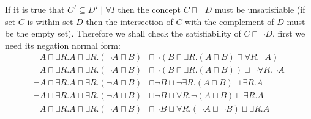 \documentclass[a4paper,12pt]{article}
\begin{document}
If it is true that $ C^I \subseteq D^I \mid \forall I$ then the concept $ C
\sqcap \neg D $ must be unsatisfiable (if set $C$ is within set $D$ then the
intersection of $C$ with the complement of $D$ must be the empty set).
Therefore we shall check the satisfiability of $ C \sqcap \neg D $, first we
need its negation normal form:
\begin{align*}
        \neg A \sqcap \exists R.A \sqcap \exists R.(\neg A \sqcap B)
&\sqcap \neg (B \sqcap \exists R.(A \sqcap B) \sqcap \forall R.\neg A)\\
        \neg A \sqcap \exists R.A \sqcap \exists R.(\neg A \sqcap B)
&\sqcap \neg (B \sqcap \exists R.(A \sqcap B)) \sqcup \neg \forall R.\neg A\\
        \neg A \sqcap \exists R.A \sqcap \exists R.(\neg A \sqcap B)
&\sqcap \neg B \sqcup \neg \exists R.(A \sqcap B) \sqcup \exists R.A\\
        \neg A \sqcap \exists R.A \sqcap \exists R.(\neg A \sqcap B)
&\sqcap \neg B \sqcup \forall R.\neg (A \sqcap B) \sqcup \exists R.A\\
        \neg A \sqcap \exists R.A \sqcap \exists R.(\neg A \sqcap B)
&\sqcap \neg B \sqcup \forall R.(\neg A \sqcup \neg B) \sqcup \exists R.A\\
\end{align*}
\end{document}
